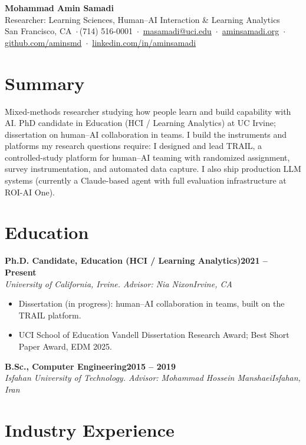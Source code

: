 \documentclass[10pt,letterpaper]{article}
\newcommand{\entry}[4]{%
  \par\textbf{#1}\hfill\textbf{#2}\\
  \textit{#3}\hfill\textit{#4}\par\vspace{1pt}}
\newcommand{\sep}{\,$\cdot$\,}
\begin{document}
\begin{center}
  {\LARGE\bfseries Mohammad Amin Samadi}\\[3pt]
  {\color{heading}Researcher: Learning Sciences, Human--AI Interaction \& Learning Analytics}\\[3pt]
  San Francisco, CA \sep (714) 516-0001 \sep
  \href{mailto:masamadi@uci.edu}{masamadi@uci.edu} \sep
  \href{https://aminsamadi.org}{aminsamadi.org} \sep
  \href{https://github.com/aminsmd}{github.com/aminsmd} \sep
  \href{https://linkedin.com/in/aminsamadi}{linkedin.com/in/aminsamadi}
\end{center}

\section{Summary}

Mixed-methods researcher studying how people learn and build capability with AI. PhD candidate in Education (HCI / Learning Analytics) at UC Irvine; dissertation on human--AI collaboration in teams. I build the instruments and platforms my research questions require: I designed and lead TRAIL, a controlled-study platform for human--AI teaming with randomized assignment, survey instrumentation, and automated data capture. I also ship production LLM systems (currently a Claude-based agent with full evaluation infrastructure at ROI-AI One).

\section{Education}

\entry{Ph.D. Candidate, Education (HCI / Learning Analytics)}{2021 -- Present}
  {University of California, Irvine. Advisor: Nia Nixon}{Irvine, CA}
\begin{itemize}
  \item Dissertation (in progress): human--AI collaboration in teams, built on the TRAIL platform.
  \item UCI School of Education Vandell Dissertation Research Award; Best Short Paper Award, EDM 2025.
\end{itemize}

\entry{B.Sc., Computer Engineering}{2015 -- 2019}
  {Isfahan University of Technology. Advisor: Mohammad Hossein Manshaei}{Isfahan, Iran}

\section{Industry Experience}
\end{document}
